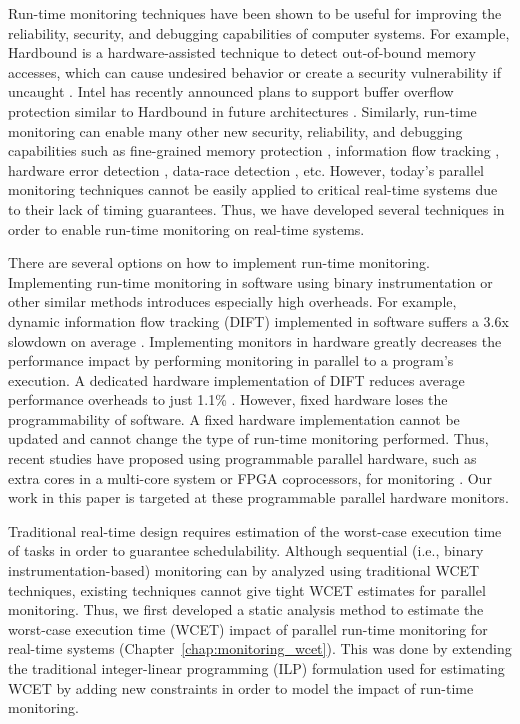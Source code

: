 Run-time monitoring techniques have been shown to be useful for improving the
reliability, security, and debugging capabilities of computer systems. For
example, Hardbound is a hardware-assisted technique to detect out-of-bound
memory accesses, which can cause undesired behavior or create a security
vulnerability if uncaught \cite{hardbound-asplos08}. Intel has recently
announced plans to support buffer overflow protection similar to Hardbound in
future architectures \cite{intel-mpx}. Similarly, run-time monitoring can
enable many other new security, reliability, and debugging capabilities such as
fine-grained memory protection \cite{mondrian-asplos02}, information flow
tracking \cite{dift-asplos04, testudo-micro08}, hardware error detection
\cite{argus-micro07}, data-race detection \cite{radish-isca12, cord-hpca06},
etc.  However, today's parallel monitoring techniques cannot be easily applied
to critical real-time systems due to their lack of timing guarantees. Thus, we
have developed several techniques in order to enable run-time monitoring on
real-time systems.

There are several options on how to implement run-time monitoring.
Implementing run-time monitoring in software using binary instrumentation or
other similar methods introduces especially high overheads. For example,
dynamic information flow tracking (DIFT) implemented in software suffers a 3.6x
slowdown on average \cite{qin06-lift}. Implementing monitors in hardware
greatly decreases the performance impact by performing monitoring in parallel
to a program's execution. A dedicated hardware implementation of DIFT reduces
average performance overheads to just 1.1\% \cite{suh-dift-asplos04}.  However,
fixed hardware loses the programmability of software. A fixed hardware
implementation cannot be updated and cannot change the type of run-time
monitoring performed. Thus, recent studies have proposed using programmable
parallel hardware, such as extra cores in a multi-core system or FPGA
coprocessors, for monitoring \cite{chen08-lba, flexcore-micro10,
harmoni-dsn12}. Our work in this paper is targeted at these programmable
parallel hardware monitors.

Traditional real-time design requires estimation of the worst-case execution
time of tasks in order to guarantee schedulability. Although sequential (i.e.,
binary instrumentation-based) monitoring can by analyzed using traditional WCET
techniques, existing techniques cannot give tight WCET estimates for parallel
monitoring.
Thus, we first developed a static analysis method to estimate the worst-case
execution time (WCET) impact of parallel run-time monitoring for real-time systems
(Chapter~\ref{chap:monitoring_wcet}). This was done by extending the
traditional integer-linear programming (ILP) formulation used for estimating
WCET by adding new constraints in order to model the impact of run-time
monitoring.

